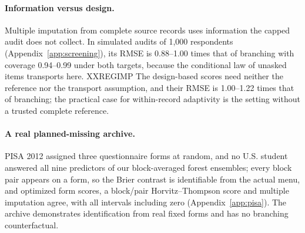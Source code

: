 \paragraph{Information versus design.}
Multiple imputation from complete source records uses information the capped audit does not collect. In simulated audits of 1,000 respondents (Appendix~\ref{app:screening}), its RMSE is 0.88--1.00 times that of branching with coverage 0.94--0.99 under both targets, because the conditional law of unasked items transports here. XXREGIMP The design-based scores need neither the reference nor the transport assumption, and their RMSE is 1.00--1.22 times that of branching; the practical case for within-record adaptivity is the setting without a trusted complete reference.

\paragraph{A real planned-missing archive.}
PISA 2012 assigned three questionnaire forms at random, and no U.S. student answered all nine predictors of our block-averaged forest ensembles; every block pair appears on a form, so the Brier contrast is identifiable from the actual menu, and optimized form scores, a block/pair Horvitz--Thompson score and multiple imputation agree, with all intervals including zero (Appendix~\ref{app:pisa}). The archive demonstrates identification from real fixed forms and has no branching counterfactual.
